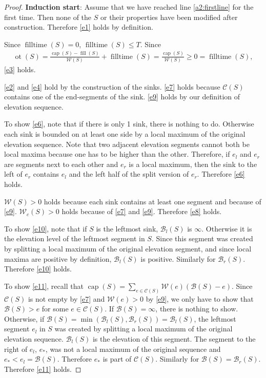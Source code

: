 \documentclass[11pt,a4paper]{article}
\DeclareMathOperator{\capp}{cap}
\DeclareMathOperator{\ot}{ot}
\DeclareMathOperator{\Fill}{fill}
\DeclareMathOperator{\filltime}{filltime}
\begin{document}
\begin{proof}
\textbf{Induction start}: Assume that we have reached line \ref{a2:firstline} for the first time.
Then none of the $S$ or their properties have been modified after construction.
Therefore \ref{e1} holds by definition.

Since $\filltime(S) = 0$, $\filltime(S) \le T$.
Since
\begin{align*}
    \ot(S) = \frac{\capp(S) - \Fill(S)}{\mathcal{W}(S)} + \filltime(S)
           = \frac{\capp(S)}{\mathcal{W}(S)}
           \ge 0 = \filltime(S),
\end{align*}
\ref{e3} holds.

\ref{e2} and \ref{e4} hold by the construction of the sinks. 
\ref{e7} holds because $\mathcal{C}(S)$ contains one of the end-segments of the sink.
\ref{e9} holds by our definition of elevation sequence.

To show \ref{e6}, note that if there is only 1 sink, there is nothing to do.
Otherwise each sink is bounded on at least one side by a local maximum of the original elevation sequence.
Note that two adjacent elevation segments cannot both be local maxima because one has to be higher than the other.
Therefore, if $e_l$ and $e_r$ are segments next to each other and $e_r$ is a local maximum, then
the sink to the left of $e_r$ contains $e_l$ and the left half of the split version of $e_r$.
Therefore \ref{e6} holds.

$\mathcal{W}(S) > 0$ holds because each sink contains at least one segment and because of \ref{e9}.
$\mathcal{W}_c(S) > 0$ holds because of \ref{e7} and \ref{e9}.
Therefore \ref{e8} holds.

To show \ref{e10}, note that if $S$ is the leftmost sink, $\mathcal{B}_l(S)$ is $\infty$.
Otherwise it is the elevation level of the leftmost segment in $S$.
Since this segment was created by splitting a local maximum of the original elevation segment, and since local maxima are positive by definition, $\mathcal{B}_l(S)$ is positive.
Similarly for $\mathcal{B}_r(S)$.
Therefore \ref{e10} holds.

To show \ref{e11}, recall that $\capp(S) = \sum_{e\in\mathcal{C}(S)} \mathcal{W}(e)(\mathcal{B}(S)-e)$.
Since $\mathcal{C}(S)$ is not empty by \ref{e7} and $\mathcal{W}(e) > 0$ by \ref{e9}, we only have
to show that $\mathcal{B}(S) > e$ for some $e\in\mathcal{C}(S)$.
If $\mathcal{B}(S)=\infty$, there is nothing to show.
Otherwise, if $\mathcal{B}(S) = \min(\mathcal{B}_l(S), \mathcal{B}_r(S)) = \mathcal{B}_l(S)$, the leftmost segment $e_l$ in $S$ was created by splitting a local maximum of the original elevation sequence.
$\mathcal{B}_l(S)$ is the elevation of this segment.
The segment to the right of $e_l$, $e_*$, was not a local maximum of the original sequence and $e_* < e_l = \mathcal{B}(S)$.
Therefore $e_*$ is part of $\mathcal{C}(S)$.
Similarly for $\mathcal{B}(S) = \mathcal{B}_r(S)$.
Therefore \ref{e11} holds.


\end{proof}
\end{document}
